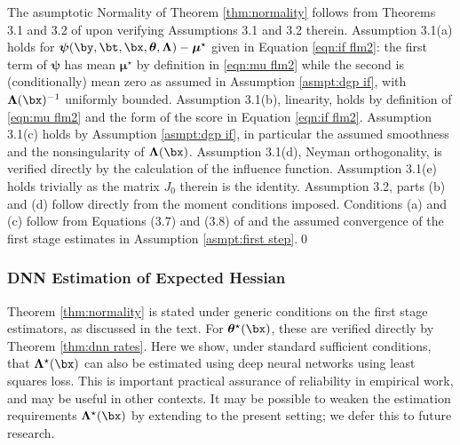 \documentclass[12pt]{article}
\numberwithin{equation}{section}
\theoremstyle{definition}
\newcommand{\bmu}{\boldsymbol{\mu}}
\newcommand{\btheta}{\boldsymbol{\theta}}
\newcommand{\bpsi}{\boldsymbol{\psi}}
\newcommand{\bL}{\boldsymbol{\Lambda}}
\newcommand{\bmtrue}{\bmu^\star}
\newcommand{\bttrue}{\btheta^\star}
\newcommand{\bLtrue}{\bL^\star}
\begin{document}
\begin{appendices}
    
The asumptotic Normality of Theorem \ref{thm:normality} follows from Theorems 3.1 and 3.2 of \cite{Chernozhukov-etal2018_EJ} upon verifying Assumptions 3.1 and 3.2 therein. Assumption 3.1(a) holds for $\bpsi(\by,\bt,\bx, \btheta, \bL) - \bmtrue$ given in Equation \eqref{eqn:if flm2}: the first term of $\bpsi$ has mean $\bmtrue$ by definition in \eqref{eqn:mu flm2} while the second is (conditionally) mean zero as assumed in Assumption \ref{asmpt:dgp if}, with $\bL(\bx)^{-1}$ uniformly bounded. Assumption 3.1(b), linearity, holds by definition of \eqref{eqn:mu flm2} and the form of the score in Equation \eqref{eqn:if flm2}. Assumption 3.1(c) holds by Assumption \ref{asmpt:dgp if}, in particular the assumed smoothness and the nonsingularity of $\bL(\bx)$. Assumption 3.1(d), Neyman orthogonality, is verified directly by the calculation of the influence function. Assumption 3.1(e) holds trivially as the matrix $J_0$ therein is the identity. Assumption 3.2, parts (b) and (d) follow directly from the moment conditions imposed. Conditions (a) and (c) follow from Equations (3.7) and (3.8) of \cite{Chernozhukov-etal2018_EJ} and the assumed convergence of the first stage estimates in Assumption \ref{asmpt:first step}.\qed

















\subsubsection{DNN Estimation of Expected Hessian}
	\label{appx:estimation of Lambda}


Theorem \ref{thm:normality} is stated under generic conditions on the first stage estimators, as discussed in the text. For $\bttrue(\bx)$, these are verified directly by Theorem \ref{thm:dnn rates}. Here we show, under standard sufficient conditions, that $\bLtrue(\bx)$ can also be estimated using deep neural networks using least squares loss. This is important practical assurance of reliability in empirical work, and may be useful in other contexts. It may be possible to weaken the estimation requirements $\bLtrue(\bx)$ by extending \cite{Chernozhukov-etal2022_Ecma} to the present setting; we defer this to future research.



\end{appendices}
\end{document}
